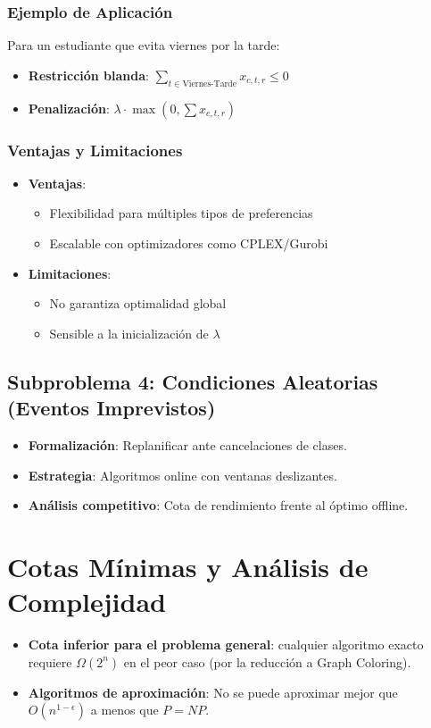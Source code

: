 \documentclass[12pt, a4paper]{article}
\begin{document}
\subsubsection*{Ejemplo de Aplicación}
Para un estudiante que evita viernes por la tarde:
\begin{itemize}
    \item \textbf{Restricción blanda}: $\sum_{t \in \text{Viernes-Tarde}} x_{c,t,r} \leq 0$
    \item \textbf{Penalización}: $\lambda \cdot \max(0, \sum x_{c,t,r})$
\end{itemize}

\subsubsection*{Ventajas y Limitaciones}
\begin{itemize}
    \item \textbf{Ventajas}:
    \begin{itemize}
        \item Flexibilidad para múltiples tipos de preferencias
        \item Escalable con optimizadores como CPLEX/Gurobi
    \end{itemize}
    
    \item \textbf{Limitaciones}:
    \begin{itemize}
        \item No garantiza optimalidad global
        \item Sensible a la inicialización de $\lambda$
    \end{itemize}
\end{itemize}

\subsection{Subproblema 4: Condiciones Aleatorias (Eventos Imprevistos)}
\begin{itemize}
    \item \textbf{Formalización}: Replanificar ante cancelaciones de clases.
    \item \textbf{Estrategia}: Algoritmos online con ventanas deslizantes.
    \item \textbf{Análisis competitivo}: Cota de rendimiento frente al óptimo offline.
\end{itemize}

\section{Cotas Mínimas y Análisis de Complejidad}
\begin{itemize}
    \item \textbf{Cota inferior para el problema general}: cualquier algoritmo exacto requiere \( \Omega(2^n) \) en el peor caso (por la reducción a Graph Coloring).
    \item \textbf{Algoritmos de aproximación}: No se puede aproximar mejor que \( O(n^{1-\epsilon}) \) a menos que \( P = NP \).
\end{itemize}
\end{document}
